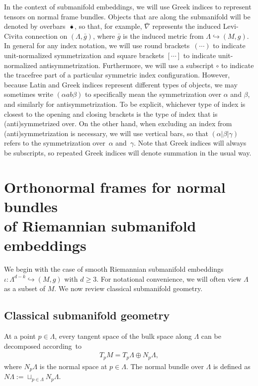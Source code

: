 In the context of submanifold embeddings, we will use Greek indices to represent tensors on normal frame bundles. Objects that are along the submanifold will be denoted by overbars~$\bar{\bullet}$, so that, for example, $\bar{\nabla}$ represents the induced Levi-Civita connection on $(\Lambda,\bar{g})$, where $\bar{g}$ is the induced metric from $\Lambda \hookrightarrow (M,g)$. In general for any index notation, we will use round brackets~$(\cdots)$ to indicate unit-normalized symmetrization and square brackets $[\cdots]$ to indicate unit-normalized antisymmetrization. Furthermore, we will use a subscript $\circ$ to indicate the tracefree part of a particular symmetric index configuration. However, because Latin and Greek indices represent different types of objects, we may sometimes write $(\alpha a b \beta)$ to specifically mean the symmetrization over $\alpha$ and $\beta$, and similarly for antisymmetrization. To be explicit, whichever type of index is closest to the opening and closing brackets is the type of index that is (anti)symmetrized over. On the other hand, when excluding an index from (anti)symmetrization is necessary, we will use vertical bars, so that $(\alpha | \beta | \gamma)$ refers to the symmetrization over~$\alpha$ and~$\gamma$. Note that Greek indices will always be subscripts, so repeated Greek indices will denote summation in the usual way.

\section[Orthonormal frames for normal bundles of Riemannian submanifold embeddings]{Orthonormal frames for normal bundles \\ of Riemannian submanifold embeddings} \label{riem-frames}

We begin with the case of smooth Riemannian submanifold embeddings $\iota \colon \Lambda^{d-k} \hookrightarrow (M,g)$ with $d \geq 3$. For notational convenience, we will often view $\Lambda$ as a subset of $M$. We now review classical submanifold geometry.

\subsection{Classical submanifold geometry}

 At a point $p \in \Lambda$, every tangent space of the bulk space along $\Lambda$ can be decomposed according~to
\begin{align} \label{TM-decomp}
T_p M = T_p \Lambda \oplus N_p \Lambda ,
\end{align}
where $N_p \Lambda$ is the normal space at $p \in \Lambda$. The normal bundle over $\Lambda$ is defined as $N \Lambda := \sqcup_{p \in \Lambda} N_p \Lambda$.

